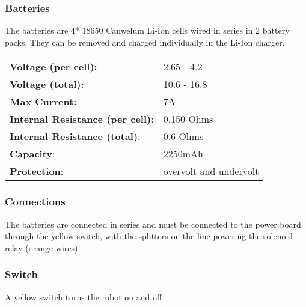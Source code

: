 \subsubsection{Batteries}
The batteries are 4* 18650 Canwelum Li-Ion cells wired in series in 2 battery packs. They can be removed and charged individually in the Li-Ion charger.

\begin{table}[H]
\begin{tabularx}{\textwidth}{XX}
\textbf{Voltage (per cell):}	& 2.65 - 4.2 \\
\textbf{Voltage (total):}		& 10.6 - 16.8 \\
\textbf{Max Current:}			& 7A \\
\textbf{Internal Resistance (per cell)}: & 0.150 Ohms \\
\textbf{Internal Resistance (total)}: & 0.6 Ohms \\
\textbf{Capacity}: & 2250mAh \\
\textbf{Protection}: & overvolt and undervolt \\
\end{tabularx}
\end{table}
   
\subsubsection{Connections}
The batteries are connected in series and must be connected to the power board through the yellow switch, with the splitters on the line powering the solenoid relay (orange wires)
\subsubsection{Switch}
A yellow switch turns the robot on and off
